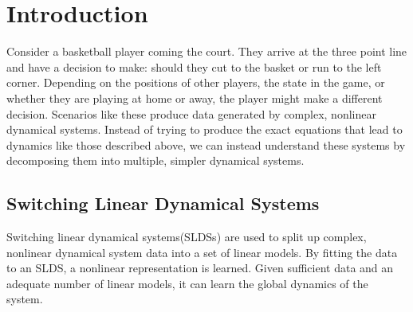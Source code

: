 
 \begin{comment}
\documentclass{amsart}

\usepackage{packages} %
\usepackage{macros} %
\newcommand{\prob}{\mathbb{P}}
\newcommand{\iid}{\overset{\mathrm{iid}}{\sim}}

\usepackage{setspace}
	\doublespacing



 \end{comment}
\section{Introduction}

Consider a basketball player coming the court. They arrive at the three point line and have a decision to make: should they cut to the basket or run to the left corner. Depending on the positions of other players, the state in the game, or whether they are playing at home or away, the player might make a different decision. Scenarios like these produce data generated by complex, nonlinear dynamical systems. Instead of trying to produce the exact equations that lead to dynamics like those described above, we can instead understand these systems by decomposing them into multiple, simpler dynamical systems.

\subsection{Switching Linear Dynamical Systems}

Switching linear dynamical systems(SLDSs) are used to split up complex, nonlinear dynamical system data into a set of linear models. By fitting the data to an SLDS, a nonlinear representation is learned. Given sufficient data and an adequate number of linear models, it can learn the global dynamics of the system.

